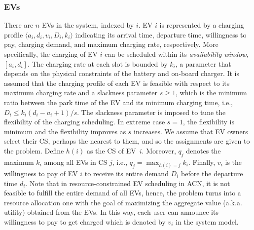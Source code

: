 \documentclass[journal]{IEEEtran}
\newcommand{\rev}[1]{{\color{black}#1}}%
\newcommand{\revv}[1]{{\color{black}#1}}%
\newcommand{\rev}[1]{#1}
\begin{document}
		\subsubsection{EVs}
		\label{sec:ev} There are $n$ EVs in the system, indexed by $i$.
		EV $i$ is represented by a charging profile $\langle a_i,d_i,v_i,D_i,k_i\rangle$ 
		indicating its arrival time, departure time, willingness to pay, charging demand, and maximum charging rate, respectively. 
		More specifically, the charging of EV $i$ can be scheduled within its \emph{availability window}, $[a_i,d_i]$. The charging rate at each slot is bounded by $k_i$, a parameter that depends on the physical constraints of the \rev{battery and on-board charger}. It is assumed that the charging profile of each EV is feasible with respect to its maximum charging rate and a slackness parameter $s\geq 1$, which is the minimum ratio between the park time of the EV and its minimum charging time, i.e., ${D_i\leq k_i(d_i-a_i+1)/s}$. The slackness parameter is imposed to tune the flexibility of the charging scheduling. In extreme case $s=1$,  the flexibility is minimum and the flexibility improves as $s$ increases. 
		We assume that EV owners select their CS, perhaps the nearest to them, and so the assignments are given to the problem. Define $h(i)$ as the CS of EV~$i$.
		Moreover, $q_j$ denotes the maximum $k_i$ among all EVs in CS $j$, i.e., $q_j=\max_{h(i)=j} k_i$. 
		\revv{Finally, $v_i$ is the willingness to pay of EV $i$ to receive its entire demand $D_i$ before the departure time $d_i$. Note that in resource-constrained EV scheduling in ACN, it is not feasible to fulfill the entire demand of all EVs, hence, the problem turns into a resource allocation one with the goal of maximizing the aggregate value (a.k.a. utility) obtained from the EVs. In this way, each user can announce its willingness to pay to get charged which is denoted by $v_i$ in the system model.}
		
\end{document}
